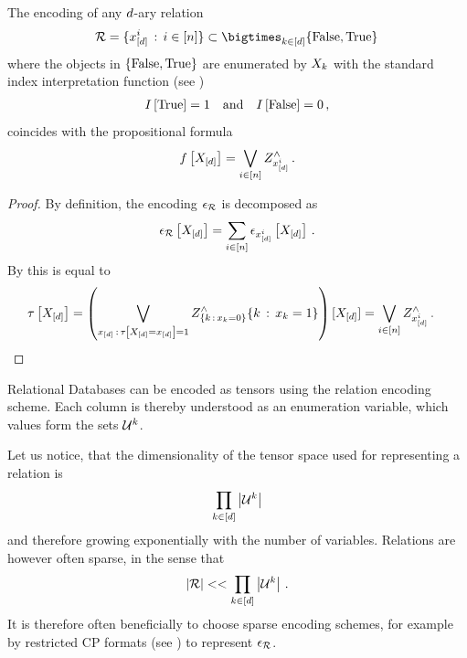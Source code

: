 \begin{theorem}
    The encoding of any $d$-ary relation
    \begin{align*}
        \exrelation = \{ \shortcatindices^{\decindex} \wcols \decindexin \} \subset \bigtimes_{\catenumeratorin} \truthset \,
    \end{align*}
    where the objects in $\{\mathrm{False},\mathrm{True}\}$ are enumerated by $X_{k}$ with the standard index interpretation function (see )
    \begin{align*}
        I\left[\mathrm{True}\right] = 1 \quad\text{and}\quad I\left[\mathrm{False}\right] = 0 \, ,
    \end{align*}
    coincides with the propositional formula
    \begin{align*}
        f\left[X_{[d]}\right] = \bigvee_{i\in[n]} Z^{\land}_{x_{[d]}^{i}} \, .
    \end{align*}
\end{theorem}
\begin{proof}
    By definition, the encoding $\epsilon_{\mathcal{R}}$ is decomposed as
    \begin{align*}
        \epsilon_{\mathcal{R}}\left[X_{[d]}\right]
        = \sum_{i\in[n]} \epsilon_{x_{[d]}^{i}}\left[X_{[d]}\right] \, .
    \end{align*}
    By  this is equal to
    \begin{align*}
        \tau\left[X_{[d]}\right] = \left( \bigvee_{x_{[d]}\,:\,\tau\left[X_{[d]}=x_{[d]}\right] = 1}
        Z^{\land}_{\{k\,:\,x_{k}=0\}}{\{k\,:\,x_{k}=1\}}
        \right)[X_{[d]}]
        = \bigvee_{i\in[n]} Z^{\land}_{x_{[d]}^{i}} \, . & \qedhere
    \end{align*}
\end{proof}


\begin{example}
    Relational Databases can be encoded as tensors using the relation encoding scheme.
    Each column is thereby understood as an enumeration variable, which values form the sets $\mathcal{U}^{k}$.
\end{example}

Let us notice, that the dimensionality of the tensor space used for representing a relation is
\begin{align*}
    \prod_{k\in[d]} \left|\mathcal{U}^{k}\right|
\end{align*}
and therefore growing exponentially with the number of variables.
Relations are however often sparse, in the sense that
\begin{align*}
    \left|\mathcal{R}\right| << \prod_{k\in[d]} \left|\mathcal{U}^{k}\right| \, .
\end{align*}
It is therefore often beneficially to choose sparse encoding schemes, for example by restricted CP formats (see ) to represent $\epsilon_{\mathcal{R}}$.

